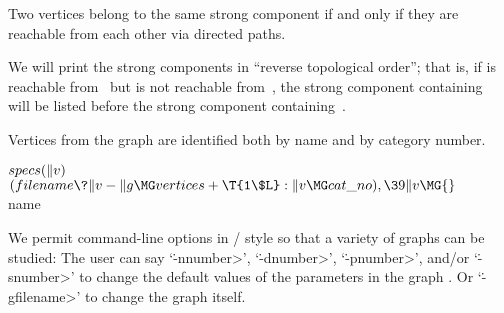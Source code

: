 Two vertices belong to the same strong component if and only if they
are reachable from each other via directed paths.

We will print the strong components in ``reverse topological order'';
that is, if  is reachable from~ but  is not reachable
from~, the strong component containing~ will be listed before
the strong component containing~.

Vertices from the  graph are identified both by name and by
category number.

\Y\B\4\D$\\{specs}(\|v)$ \5
$(\\{filename}\?\|v-\|g\MG\\{vertices}+\T{1\$L}:\|v\MG\\{cat\_no}),\39\|v\MG{}$%
\\{name}\par
\fi

We permit command-line options in \UNIX/ style so that a variety of
graphs can be studied:
The user can say `\.{-n}\<number>', `\.{-d}\<number>', `\.{-p}\<number>',
and/or `\.{-s}\<number>' to change the default values of the parameters
in the graph . Or `\.{-g}\<filename>' to
change the
graph itself.

